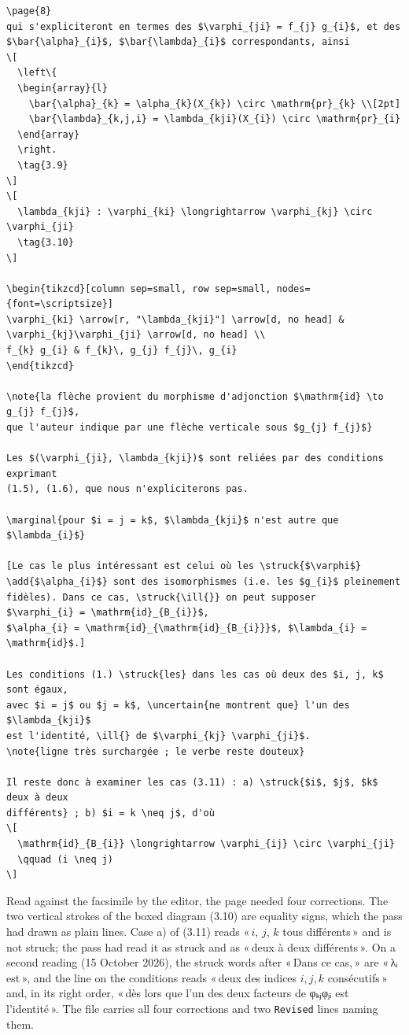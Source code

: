\documentclass[11pt]{article}
\newcommand{\q}[1]{«\,#1\,»}
\begin{document}
\begin{lstlisting}
\page{8}
qui s'expliciteront en termes des $\varphi_{ji} = f_{j} g_{i}$, et des
$\bar{\alpha}_{i}$, $\bar{\lambda}_{i}$ correspondants, ainsi
\[
  \left\{
  \begin{array}{l}
    \bar{\alpha}_{k} = \alpha_{k}(X_{k}) \circ \mathrm{pr}_{k} \\[2pt]
    \bar{\lambda}_{k,j,i} = \lambda_{kji}(X_{i}) \circ \mathrm{pr}_{i}
  \end{array}
  \right.
  \tag{3.9}
\]
\[
  \lambda_{kji} : \varphi_{ki} \longrightarrow \varphi_{kj} \circ \varphi_{ji}
  \tag{3.10}
\]

\begin{tikzcd}[column sep=small, row sep=small, nodes={font=\scriptsize}]
\varphi_{ki} \arrow[r, "\lambda_{kji}"] \arrow[d, no head] & \varphi_{kj}\varphi_{ji} \arrow[d, no head] \\
f_{k} g_{i} & f_{k}\, g_{j} f_{j}\, g_{i}
\end{tikzcd}

\note{la flèche provient du morphisme d'adjonction $\mathrm{id} \to g_{j} f_{j}$,
que l'auteur indique par une flèche verticale sous $g_{j} f_{j}$}

Les $(\varphi_{ji}, \lambda_{kji})$ sont reliées par des conditions exprimant
(1.5), (1.6), que nous n'expliciterons pas.

\marginal{pour $i = j = k$, $\lambda_{kji}$ n'est autre que $\lambda_{i}$}

[Le cas le plus intéressant est celui où les \struck{$\varphi$}
\add{$\alpha_{i}$} sont des isomorphismes (i.e. les $g_{i}$ pleinement
fidèles). Dans ce cas, \struck{\ill{}} on peut supposer
$\varphi_{i} = \mathrm{id}_{B_{i}}$,
$\alpha_{i} = \mathrm{id}_{\mathrm{id}_{B_{i}}}$, $\lambda_{i} = \mathrm{id}$.]

Les conditions (1.) \struck{les} dans les cas où deux des $i, j, k$ sont égaux,
avec $i = j$ ou $j = k$, \uncertain{ne montrent que} l'un des $\lambda_{kji}$
est l'identité, \ill{} de $\varphi_{kj} \varphi_{ji}$.
\note{ligne très surchargée ; le verbe reste douteux}

Il reste donc à examiner les cas (3.11) : a) \struck{$i$, $j$, $k$ deux à deux
différents} ; b) $i = k \neq j$, d'où
\[
  \mathrm{id}_{B_{i}} \longrightarrow \varphi_{ij} \circ \varphi_{ji}
  \qquad (i \neq j)
\]
\end{lstlisting}

Read against the facsimile by the editor, the page needed four corrections. The two vertical strokes of the boxed diagram (3.10) are equality signs, which the pass had drawn as plain lines. Case a) of (3.11) reads \q{\(i\), \(j\), \(k\) tous différents} and is not struck; the pass had read it as struck and as \q{deux à deux différents}. On a second reading (15 October 2026), the struck words after \q{Dans ce cas,} are \q{λᵢ est}, and the line on the conditions reads \q{deux des indices \(i, j, k\) consécutifs} and, in its right order, \q{dès lors que l'un des deux facteurs de φₖⱼφⱼᵢ est l'identité}. The file carries all four corrections and two \texttt{Revised} lines naming them.
\end{document}
